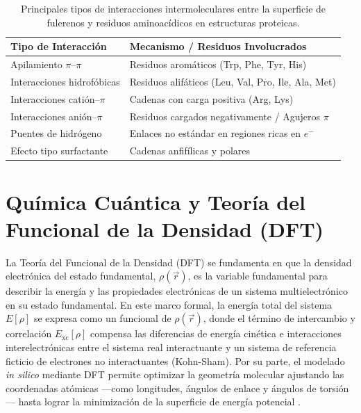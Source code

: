 \begin{table}[H]
\centering
\caption{Principales tipos de interacciones intermoleculares entre la superficie de fulerenos y residuos aminoacídicos en estructuras proteicas.}
\label{tab:interacciones_fullereno}
\begin{tabular}{l l}
\toprule
\textbf{Tipo de Interacción} & \textbf{Mecanismo / Residuos Involucrados} \\
\midrule
Apilamiento $\pi$--$\pi$ & Residuos aromáticos (Trp, Phe, Tyr, His) \\
Interacciones hidrofóbicas & Residuos alifáticos (Leu, Val, Pro, Ile, Ala, Met) \\
Interacciones catión--$\pi$ & Cadenas con carga positiva (Arg, Lys) \\
Interacciones anión--$\pi$ & Residuos cargados negativamente / Agujeros $\pi$ \\
Puentes de hidrógeno & Enlaces no estándar en regiones ricas en $e^-$ \\
Efecto tipo surfactante & Cadenas anfifílicas y polares \\
\bottomrule
\end{tabular}
\end{table}

\section{Química Cuántica y Teoría del Funcional de la Densidad (DFT)}
La Teoría del Funcional de la Densidad (DFT) se fundamenta en que la densidad electrónica del estado fundamental, $\rho(\vec{r})$, es la variable fundamental para describir la energía y las propiedades electrónicas de un sistema multielectrónico en su estado fundamental. En este marco formal, la energía total del sistema $E[\rho]$ se expresa como un funcional de $\rho(\vec{r})$, donde el término de intercambio y correlación $E_{\text{xc}}[\rho]$ compensa las diferencias de energía cinética e interacciones interelectrónicas entre el sistema real interactuante y un sistema de referencia ficticio de electrones no interactuantes (Kohn-Sham). Por su parte, el modelado \textit{in silico} mediante DFT permite optimizar la geometría molecular ajustando las coordenadas atómicas —como longitudes, ángulos de enlace y ángulos de torsión— hasta lograr la minimización de la superficie de energía potencial \cite{kohn1965self}.

